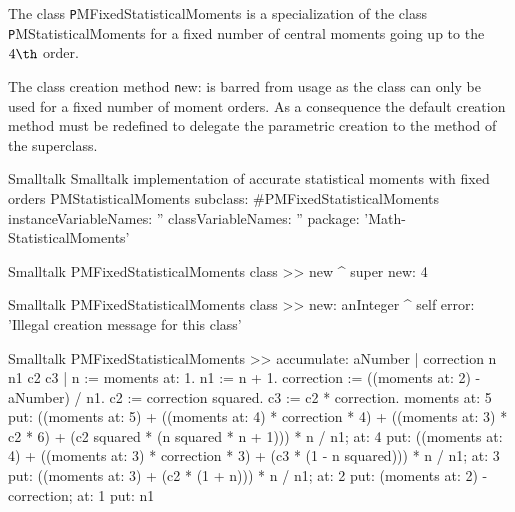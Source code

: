 The class {\texttt PMFixedStatisticalMoments} is a specialization of
the class {\texttt PMStatisticalMoments} for a fixed number of
central moments going up to the $4\th$ order.

The class creation method {\texttt new:} is barred from usage as the
class can only be used for a fixed number of moment orders. As a
consequence the default creation method must be redefined to
delegate the parametric creation to the method of the superclass.

\begin{listing}[label=ls:fixedmoments]{Smalltalk}
{Smalltalk implementation of accurate statistical moments with fixed orders}
PMStatisticalMoments subclass: #PMFixedStatisticalMoments
   instanceVariableNames: ''
   classVariableNames: ''
   package: 'Math-StatisticalMoments'
\end{listing}

\begin{displaycode}{Smalltalk}
PMFixedStatisticalMoments class >> new
    ^ super new: 4
\end{displaycode}

\begin{displaycode}{Smalltalk}
PMFixedStatisticalMoments class >> new: anInteger
    ^ self error: 'Illegal creation message for this class'
\end{displaycode}

\begin{displaycode}{Smalltalk}
PMFixedStatisticalMoments >> accumulate: aNumber
    | correction n n1 c2 c3 |
    n := moments at: 1.
    n1 := n + 1.
    correction := ((moments at: 2) - aNumber) / n1.
    c2 := correction squared.
    c3 := c2 * correction.
    moments
        at: 5
            put: ((moments at: 5) + ((moments at: 4) * correction * 
                                                                   4) 
                    + ((moments at: 3) * c2 * 6) + (c2 squared * (n 
                                                   squared * n + 1))) 
                    * n / n1;
        at: 4
            put: ((moments at: 4) + ((moments at: 3) * correction * 
                                                                   3) 
                    + (c3 * (1 - n squared))) * n 
                    / n1;
        at: 3 put: ((moments at: 3) + (c2 * (1 + n))) * n / n1;
        at: 2 put: (moments at: 2) - correction;
        at: 1 put: n1
\end{displaycode}

